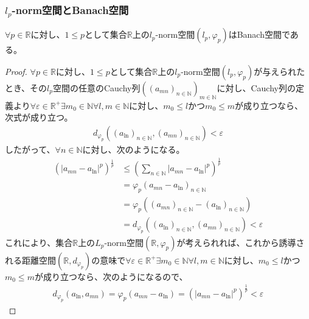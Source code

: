 \documentclass[dvipdfmx]{jsarticle}
\begin{document}
\subsubsection{$l_{p}$-norm空間とBanach空間}%
\begin{thm}\label{2.3.3.4}
$\forall p \in \mathbb{R}$に対し、$1 \leq p$として集合$\mathbb{R}$上の$l_{p}$-norm空間$\left( l_{p},\varphi_{p} \right)$はBanach空間である。
\end{thm}
\begin{proof}
$\forall p \in \mathbb{R}$に対し、$1 \leq p$として集合$\mathbb{R}$上の$l_{p}$-norm空間$\left( l_{p},\varphi_{p} \right)$が与えられたとき、その$l_{p}$空間の任意のCauchy列$\left( \left( a_{mn} \right)_{n \in \mathbb{N}} \right)_{m \in \mathbb{N}}$に対し、Cauchy列の定義より$\forall\varepsilon \in \mathbb{R}^{+}\exists m_{0} \in \mathbb{N}\forall l,m \in \mathbb{N}$に対し、$m_{0} \leq l$かつ$m_{0} \leq m$が成り立つなら、次式が成り立つ。
\begin{align*}
d_{\varphi_{p}}\left( \left( a_{\ln} \right)_{n \in \mathbb{N}},\left( a_{mn} \right)_{n \in \mathbb{N}} \right) < \varepsilon
\end{align*}
したがって、$\forall n \in \mathbb{N}$に対し、次のようになる。
\begin{align*}
\left( \left| a_{mn} - a_{\ln} \right|^{p} \right)^{\frac{1}{p}} &\leq \left( \sum_{n \in \mathbb{N}} \left| a_{mn} - a_{\ln} \right|^{p} \right)^{\frac{1}{p}}\\
&= \varphi_{p}\left( a_{mn} - a_{\ln} \right)_{n \in \mathbb{N}}\\
&= \varphi_{p}\left( \left( a_{mn} \right)_{n \in \mathbb{N}} - \left( a_{\ln} \right)_{n \in \mathbb{N}} \right)\\
&= d_{\varphi_{p}}\left( \left( a_{\ln} \right)_{n \in \mathbb{N}},\left( a_{mn} \right)_{n \in \mathbb{N}} \right) < \varepsilon
\end{align*}
これにより、集合$\mathbb{R}$上の$L_{p}$-norm空間$\left( \mathbb{R},\varphi_{p} \right)$が考えられれば、これから誘導される距離空間$\left( \mathbb{R},d_{\varphi_{p}} \right)$の意味で$\forall\varepsilon \in \mathbb{R}^{+}\exists m_{0} \in \mathbb{N}\forall l,m \in \mathbb{N}$に対し、$m_{0} \leq l$かつ$m_{0} \leq m$が成り立つなら、次のようになるので、
\begin{align*}
d_{\varphi_{p}}\left( a_{\ln},a_{mn} \right) = \varphi_{p}\left( a_{mn} - a_{\ln} \right) = \left( \left| a_{mn} - a_{\ln} \right|^{p} \right)^{\frac{1}{p}} < \varepsilon
\end{align*}

\end{proof}
\end{document}
